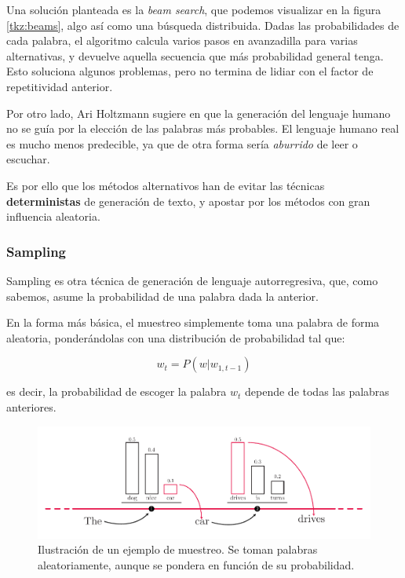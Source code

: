 Una solución planteada es la \textit{beam search}, que podemos visualizar en la figura \ref{tkz:beams}, algo así como una búsqueda distribuida. Dadas las probabilidades de cada palabra, el algoritmo calcula varios pasos en avanzadilla para varias alternativas, y devuelve aquella secuencia que más probabilidad general tenga. Esto soluciona algunos problemas, pero no termina de lidiar con el factor de repetitividad anterior. 

Por otro lado, Ari Holtzmann sugiere en \cite{holtzman2020curious} que la generación del lenguaje humano no se guía por la elección de las palabras más probables. El lenguaje humano real es mucho menos predecible, ya que de otra forma sería \textit{aburrido} de leer o escuchar.

Es por ello que los métodos alternativos han de evitar las técnicas \textbf{deterministas} de generación de texto, y apostar por los métodos con gran influencia aleatoria.

\subsubsection{Sampling}

Sampling es otra técnica de generación de lenguaje autorregresiva, que, como sabemos, asume la probabilidad de una palabra dada la anterior.

En la forma más básica, el muestreo simplemente toma una palabra de forma aleatoria, ponderándolas con una distribución de probabilidad tal que:

\begin{equation}
	w_t = P(w | w_{1, t-1})
\end{equation}

es decir, la probabilidad de escoger la palabra $w_t$ depende de todas las palabras anteriores.

\begin{figure}[h]
	\centering
	\includegraphics[width=.9\textwidth]{media/sampling.pdf}
	\caption{Ilustración de un ejemplo de muestreo. Se toman palabras aleatoriamente, aunque se pondera en función de su probabilidad.}
	\label{fig:sampling}
\end{figure}

